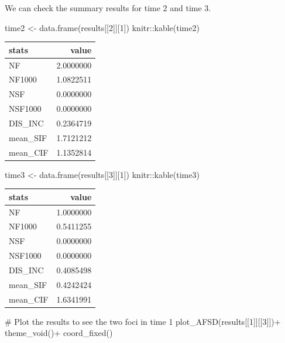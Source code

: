 \documentclass[
  letterpaper,
  DIV=11,
  numbers=noendperiod]{scrreprt}
\newenvironment{Shaded}{\begin{snugshade}}{\end{snugshade}}
\newcommand{\CommentTok}[1]{\textcolor[rgb]{0.37,0.37,0.37}{#1}}
\newcommand{\DecValTok}[1]{\textcolor[rgb]{0.68,0.00,0.00}{#1}}
\newcommand{\FunctionTok}[1]{\textcolor[rgb]{0.28,0.35,0.67}{#1}}
\newcommand{\NormalTok}[1]{\textcolor[rgb]{0.00,0.23,0.31}{#1}}
\newcommand{\OtherTok}[1]{\textcolor[rgb]{0.00,0.23,0.31}{#1}}
\newcommand{\SpecialCharTok}[1]{\textcolor[rgb]{0.37,0.37,0.37}{#1}}
\begin{document}
We can check the summary results for time 2 and time 3.

\begin{Shaded}
\begin{Highlighting}[]
\NormalTok{time2 }\OtherTok{\textless{}{-}} \FunctionTok{data.frame}\NormalTok{(results[[}\DecValTok{2}\NormalTok{]][}\DecValTok{1}\NormalTok{])}
\NormalTok{knitr}\SpecialCharTok{::}\FunctionTok{kable}\NormalTok{(time2)}
\end{Highlighting}
\end{Shaded}

\begin{longtable}[]{@{}lr@{}}
\toprule\noalign{}
stats & value \\
\midrule\noalign{}
\endhead
\bottomrule\noalign{}
\endlastfoot
NF & 2.0000000 \\
NF1000 & 1.0822511 \\
NSF & 0.0000000 \\
NSF1000 & 0.0000000 \\
DIS\_INC & 0.2364719 \\
mean\_SIF & 1.7121212 \\
mean\_CIF & 1.1352814 \\
\end{longtable}

\begin{Shaded}
\begin{Highlighting}[]
\NormalTok{time3 }\OtherTok{\textless{}{-}} \FunctionTok{data.frame}\NormalTok{(results[[}\DecValTok{3}\NormalTok{]][}\DecValTok{1}\NormalTok{])}
\NormalTok{knitr}\SpecialCharTok{::}\FunctionTok{kable}\NormalTok{(time3)}
\end{Highlighting}
\end{Shaded}

\begin{longtable}[]{@{}lr@{}}
\toprule\noalign{}
stats & value \\
\midrule\noalign{}
\endhead
\bottomrule\noalign{}
\endlastfoot
NF & 1.0000000 \\
NF1000 & 0.5411255 \\
NSF & 0.0000000 \\
NSF1000 & 0.0000000 \\
DIS\_INC & 0.4085498 \\
mean\_SIF & 0.4242424 \\
mean\_CIF & 1.6341991 \\
\end{longtable}

\begin{Shaded}
\begin{Highlighting}[]
\CommentTok{\# Plot the results to see the two foci in time 1}
\FunctionTok{plot\_AFSD}\NormalTok{(results[[}\DecValTok{1}\NormalTok{]][[}\DecValTok{3}\NormalTok{]])}\SpecialCharTok{+}
  \FunctionTok{theme\_void}\NormalTok{()}\SpecialCharTok{+}
  \FunctionTok{coord\_fixed}\NormalTok{()}
\end{Highlighting}
\end{Shaded}
\end{document}
